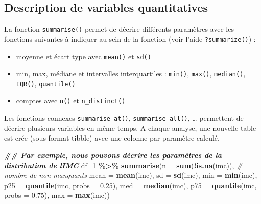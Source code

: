\documentclass[
]{book}
\newenvironment{Shaded}{\begin{snugshade}}{\end{snugshade}}
\newcommand{\AttributeTok}[1]{\textcolor[rgb]{0.13,0.29,0.53}{#1}}
\newcommand{\CommentTok}[1]{\textcolor[rgb]{0.56,0.35,0.01}{\textit{#1}}}
\newcommand{\DocumentationTok}[1]{\textcolor[rgb]{0.56,0.35,0.01}{\textbf{\textit{#1}}}}
\newcommand{\FloatTok}[1]{\textcolor[rgb]{0.00,0.00,0.81}{#1}}
\newcommand{\FunctionTok}[1]{\textcolor[rgb]{0.13,0.29,0.53}{\textbf{#1}}}
\newcommand{\NormalTok}[1]{#1}
\newcommand{\SpecialCharTok}[1]{\textcolor[rgb]{0.81,0.36,0.00}{\textbf{#1}}}
\providecommand{\tightlist}{%
  \setlength{\itemsep}{0pt}\setlength{\parskip}{0pt}}
\begin{document}
\subsection{Description de variables quantitatives}\label{description-de-variables-quantitatives}

La fonction \texttt{summarise()} permet de décrire différents paramètres avec les fonctions suivantes à indiquer au sein de la fonction (voir l'aide \texttt{?summarize()}) :

\begin{itemize}
\tightlist
\item
  moyenne et écart type avec \texttt{mean()} et \texttt{sd()}
\item
  min, max, médiane et intervalles interquartiles : \texttt{min()}, \texttt{max()}, \texttt{median()}, \texttt{IQR()}, \texttt{quantile()}
\item
  comptes avec \texttt{n()} et \texttt{n\_distinct()}
\end{itemize}

Les fonctions connexes \texttt{summarise\_at()}, \texttt{summarise\_all()}, \ldots{} permettent de décrire plusieurs variables en même temps. A chaque analyse, une nouvelle table est crée (sous format tibble) avec une colonne par paramètre calculé.

\begin{Shaded}
\begin{Highlighting}[]
\DocumentationTok{\#\# Par exemple, nous pouvons décrire les paramètres de la distribution de l\textquotesingle{}IMC }
\NormalTok{df\_1 }\SpecialCharTok{\%\textgreater{}\%} \FunctionTok{summarise}\NormalTok{(}\AttributeTok{n =} \FunctionTok{sum}\NormalTok{(}\SpecialCharTok{!}\FunctionTok{is.na}\NormalTok{(imc)), }\CommentTok{\# nombre de non{-}manquants}
                   \AttributeTok{mean =} \FunctionTok{mean}\NormalTok{(imc), }
                   \AttributeTok{sd =} \FunctionTok{sd}\NormalTok{(imc), }
                   \AttributeTok{min =} \FunctionTok{min}\NormalTok{(imc), }
                   \AttributeTok{p25 =} \FunctionTok{quantile}\NormalTok{(imc, }\AttributeTok{probs =} \FloatTok{0.25}\NormalTok{),}
                   \AttributeTok{med =} \FunctionTok{median}\NormalTok{(imc),}
                   \AttributeTok{p75 =} \FunctionTok{quantile}\NormalTok{(imc, }\AttributeTok{probs =} \FloatTok{0.75}\NormalTok{),}
                   \AttributeTok{max =} \FunctionTok{max}\NormalTok{(imc))}
\end{Highlighting}
\end{Shaded}
\end{document}
